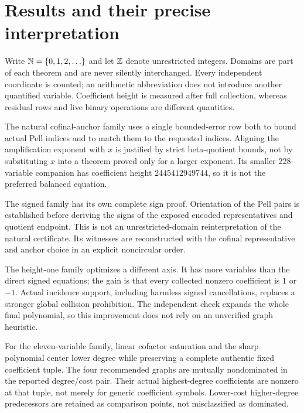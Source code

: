 \section{Results and their precise interpretation}
Write $\mathbb N=\{0,1,2,\ldots\}$ and let $\mathbb Z$ denote unrestricted integers. Domains are part of each theorem and are never silently interchanged. Every independent coordinate is counted; an arithmetic abbreviation does not introduce another quantified variable. Coefficient height is measured after full collection, whereas residual rows and live binary operations are different quantities.



The natural cofinal-anchor family uses a single bounded-error row both to bound actual Pell indices and to match them to the requested indices. Aligning the amplification exponent with $x$ is justified by strict beta-quotient bounds, not by substituting $x$ into a theorem proved only for a larger exponent. Its smaller 228-variable companion has coefficient height $2445412949744$, so it is not the preferred balanced equation.

The signed family has its own complete sign proof. Orientation of the Pell pairs is established before deriving the signs of the exposed encoded representatives and quotient endpoint. This is not an unrestricted-domain reinterpretation of the natural certificate. Its witnesses are reconstructed with the cofinal representative and anchor choice in an explicit noncircular order.

The height-one family optimizes a different axis. It has more variables than the direct signed equations; the gain is that every collected nonzero coefficient is $1$ or $-1$. Actual incidence support, including harmless signed cancellations, replaces a stronger global collision prohibition. The independent check expands the whole final polynomial, so this improvement does not rely on an unverified graph heuristic.

For the eleven-variable family, linear cofactor saturation and the sharp polynomial center lower degree while preserving a complete authentic fixed coefficient tuple. The four recommended graphs are mutually nondominated in the reported degree/cost pair. Their actual highest-degree coefficients are nonzero at that tuple, not merely for generic coefficient symbols. Lower-cost higher-degree predecessors are retained as comparison points, not misclassified as dominated.

